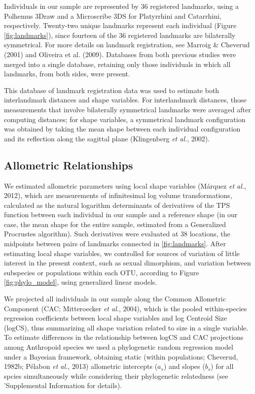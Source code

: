 \documentclass[12pt,twoside]{report}
\begin{document}
Individuals in our sample are represented by 36 registered landmarks,
using a Polhemus 3Draw and a Microscribe 3DS for Platyrrhini and
Catarrhini, respectively. Twenty-two unique landmarks represent each
individual (Figure \ref{fig:landmarks}), since fourteen of the 36
registered landmarks are bilaterally symmetrical. For more details on
landmark registration, see Marroig \& Cheverud (2001) and Oliveira et
al. (2009). Databases from both previous studies were merged into a
single database, retaining only those individuals in which all
landmarks, from both sides, were present.

This database of landmark registration data was used to estimate both
interlandmark distances and shape variables. For interlandmark
distances, those measurements that involve bilaterally symmetrical
landmarks were averaged after computing distances; for shape variables,
a symmetrical landmark configuration was obtained by taking the mean
shape between each individual configuration and its reflection along the
sagittal plane (Klingenberg \emph{et al.}, 2002).

\subsection{Allometric Relationships}\label{allometric-relationships}

We estimated allometric parameters using local shape variables (Márquez
\emph{et al.}, 2012), which are measurements of infinitesimal log volume
transformations, calculated as the natural logarithm determinants of
derivatives of the TPS function between each individual in our sample
and a reference shape (in our case, the mean shape for the entire
sample, estimated from a Generalized Procrustes algorithm). Such
derivatives were evaluated at 38 locations, the midpoints between pairs
of landmarks connected in \autoref{fig:landmarks}. After estimating
local shape variables, we controlled for sources of variation of little
interest in the present context, such as sexual dimorphism, and
variation between subspecies or populations within each OTU, according
to Figure \ref{fig:phylo_model}, using generalized linear models.

We projected all individuals in our sample along the Common Allometric
Component (CAC; Mitteroecker \emph{et al.}, 2004), which is the pooled
within-species regression coefficients between local shape variables and
log Centroid Size (logCS), thus summarizing all shape variation related
to size in a single variable. To estimate differences in the
relationship between logCS and CAC projections among Anthropoid species
we used a phylogenetic random regression model under a Bayesian
framework, obtaining static (within populations; Cheverud, 1982b;
Pélabon \emph{et al.}, 2013) allometric intercepts ($a_s$) and slopes
($b_s$) for all spcies simultaneously while considering their
phylogenetic relatedness (see 'Supplemental Information for details).
\end{document}
